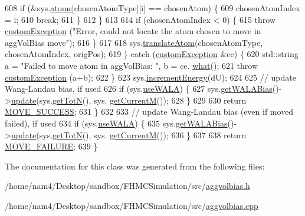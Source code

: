 \begin{DoxyCode}
608                 \textcolor{keywordflow}{if} (&sys.\hyperlink{classsim_system_a90421b19082f7fb8fc23b7264b1161e4}{atoms}[chosenAtomType][i] == chosenAtom) \{
609                     chosenAtomIndex = i;
610                     \textcolor{keywordflow}{break};
611                 \}
612             \}
613 
614             \textcolor{keywordflow}{if} (chosenAtomIndex < 0) \{
615                 \textcolor{keywordflow}{throw} \hyperlink{classcustom_exception}{customException} (\textcolor{stringliteral}{"Error, could not locate the atom chosen to move in
       aggVolBias move"});
616             \}
617 
618             sys.\hyperlink{classsim_system_a22fdaceea44abd6cd021bac1ecd11890}{translateAtom}(chosenAtomType, chosenAtomIndex, origPos);
619             \} \textcolor{keywordflow}{catch} (\hyperlink{classcustom_exception}{customException} &ce) \{
620                     std::string a = \textcolor{stringliteral}{"Failed to move atom in aggVolBias: "}, b = ce.
      \hyperlink{classcustom_exception_aeb6ab5848b038adfc68fde86a512f691}{what}();
621                     \textcolor{keywordflow}{throw} \hyperlink{classcustom_exception}{customException} (a+b);
622             \}
623             sys.\hyperlink{classsim_system_a6ad31c08955b80873f865b3069618dcb}{incrementEnergy}(dU);
624 
625             \textcolor{comment}{// update Wang-Landau bias, if used}
626             \textcolor{keywordflow}{if} (sys.\hyperlink{classsim_system_aa83b00006b3919fb6e13f1bdeadece6a}{useWALA}) \{
627                     sys.\hyperlink{classsim_system_a7cb5049de8b0988349e89e30e4000407}{getWALABias}()->\hyperlink{classwala_ab439e3f60bea6c54522a870b9ad67acf}{update}(sys.\hyperlink{classsim_system_a37dd827f4057049763351510147b9f1d}{getTotN}(), sys.
      \hyperlink{classsim_system_a299fe4372e610b554eaaf5f5957b2dbc}{getCurrentM}());
628             \}
629 
630             \textcolor{keywordflow}{return} \hyperlink{moves_8h_ae8285cbddc5d21f73f49dcbad82a775a}{MOVE\_SUCCESS};
631         \}
632 
633         \textcolor{comment}{// update Wang-Landau bias (even if moved failed), if used}
634         \textcolor{keywordflow}{if} (sys.\hyperlink{classsim_system_aa83b00006b3919fb6e13f1bdeadece6a}{useWALA}) \{
635             sys.\hyperlink{classsim_system_a7cb5049de8b0988349e89e30e4000407}{getWALABias}()->\hyperlink{classwala_ab439e3f60bea6c54522a870b9ad67acf}{update}(sys.\hyperlink{classsim_system_a37dd827f4057049763351510147b9f1d}{getTotN}(), sys.
      \hyperlink{classsim_system_a299fe4372e610b554eaaf5f5957b2dbc}{getCurrentM}());
636         \}
637 
638         \textcolor{keywordflow}{return} \hyperlink{moves_8h_a9832cf5fcfa8c0894545b591c9908e39}{MOVE\_FAILURE};
639 \}
\end{DoxyCode}


The documentation for this class was generated from the following files\-:\begin{DoxyCompactItemize}
\item 
/home/nam4/\-Desktop/sandbox/\-F\-H\-M\-C\-Simulation/src/\hyperlink{aggvolbias_8h}{aggvolbias.\-h}\item 
/home/nam4/\-Desktop/sandbox/\-F\-H\-M\-C\-Simulation/src/\hyperlink{aggvolbias_8cpp}{aggvolbias.\-cpp}\end{DoxyCompactItemize}
